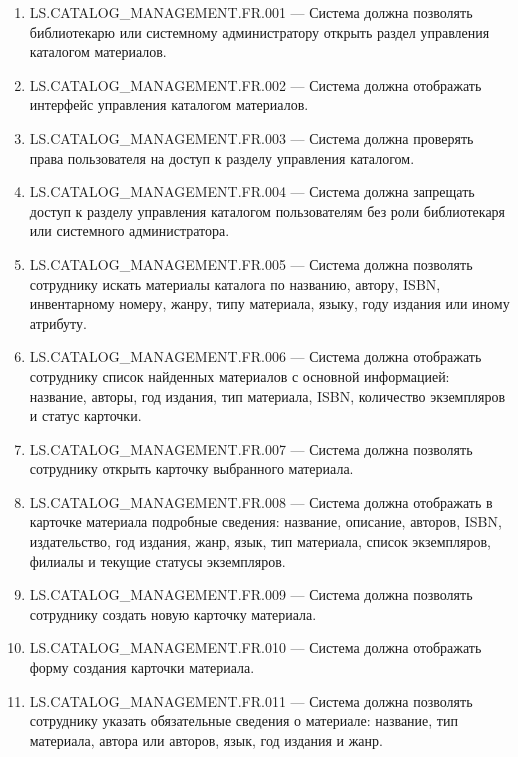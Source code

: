 \documentclass[12pt,a4paper]{article}
\begin{document}
	\begin{enumerate}
		\item LS.CATALOG\_MANAGEMENT.FR.001 --- Система должна позволять библиотекарю
		или системному администратору открыть раздел управления каталогом материалов.
		
		\item LS.CATALOG\_MANAGEMENT.FR.002 --- Система должна отображать интерфейс
		управления каталогом материалов.
		
		\item LS.CATALOG\_MANAGEMENT.FR.003 --- Система должна проверять права пользователя
		на доступ к разделу управления каталогом.
		
		\item LS.CATALOG\_MANAGEMENT.FR.004 --- Система должна запрещать доступ к разделу
		управления каталогом пользователям без роли библиотекаря или системного
		администратора.
		
		\item LS.CATALOG\_MANAGEMENT.FR.005 --- Система должна позволять сотруднику
		искать материалы каталога по названию, автору, ISBN, инвентарному номеру,
		жанру, типу материала, языку, году издания или иному атрибуту.
		
		\item LS.CATALOG\_MANAGEMENT.FR.006 --- Система должна отображать сотруднику
		список найденных материалов с основной информацией: название, авторы, год
		издания, тип материала, ISBN, количество экземпляров и статус карточки.
		
		\item LS.CATALOG\_MANAGEMENT.FR.007 --- Система должна позволять сотруднику
		открыть карточку выбранного материала.
		
		\item LS.CATALOG\_MANAGEMENT.FR.008 --- Система должна отображать в карточке
		материала подробные сведения: название, описание, авторов, ISBN, издательство,
		год издания, жанр, язык, тип материала, список экземпляров, филиалы и текущие
		статусы экземпляров.
		
		\item LS.CATALOG\_MANAGEMENT.FR.009 --- Система должна позволять сотруднику
		создать новую карточку материала.
		
		\item LS.CATALOG\_MANAGEMENT.FR.010 --- Система должна отображать форму создания
		карточки материала.
		
		\item LS.CATALOG\_MANAGEMENT.FR.011 --- Система должна позволять сотруднику
		указать обязательные сведения о материале: название, тип материала, автора или
		авторов, язык, год издания и жанр.
		

\end{enumerate}
\end{document}
